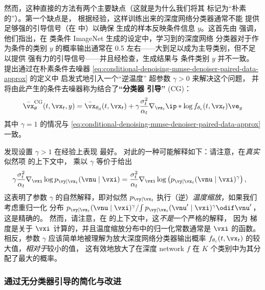 \documentclass[../../book-main_zh.tex]{subfiles}
\begin{document}
然而，这种直接的方法有两个主要缺点（这就是为什么我们将其
标记为“朴素的”）。第一个缺点是，
根据经验，这样训练出来的深度网络分类器通常不能
提供足够强的引导信号（在
 中）以确保
生成的样本反映条件信息 $y$。这首先由 \citet{Dhariwal2021-hg} 强调，他们指出，在
类条件 ImageNet 生成的设定中，学习到的深度网络
分类器对于作为条件的类别 $y$ 的概率输出通常在
0.5 左右——大到足以成为主导类别，但不足以提供
强有力的引导信号——并且经检查，生成结果与
条件类别 $y$ 并不一致。\citet{Dhariwal2021-hg} 提出通过在朴素条件去噪器
\eqref{eq:conditional-denoising-mmse-denoiser-paired-data-approx} 的定义中
启发式地引入一个“逆温度”
超参数 $\gamma > 0$ 来解决这个问题，
并将由此产生的条件去噪器称为结合了\textbf{“分类器
引导”}
(CG)：
\begin{equation}\label{eq:conditional-denoising-mmse-denoiser-paired-data-approx-cg}
    \bar{\vx}_{\theta}^{\mathrm{CG}}(t, \vx_t, y)
    =
    \bar{\vx}_{\theta_{\mathrm{d}}}(t, \vx_t)
    + \gamma\frac{\sigma_t^2}{\alpha_t}
    \nabla_{\vx_t}
    \ip*{
        \log f_{\theta_{\mathrm{c}}}(t, \vx_t)
    }{
        \ve_{y}
    }
\end{equation}
其中 $\gamma = 1$ 的情况与
\eqref{eq:conditional-denoising-mmse-denoiser-paired-data-approx} 一致。

\citet{Dhariwal2021-hg} 发现设置 $\gamma > 1$ 在经验上表现
最好。
对此的一种可能解释如下：请注意，在\textit{真实}似然项
 的上下文中，
乘以 $\gamma$ 等价于给出
\begin{align}
    \gamma\frac{\sigma_t^2}{\alpha_t} \nabla_{\vxi}\log p_{\vy \mid
    \vx_t}(\vnu\mid
    \vxi)
    &=
    \frac{\sigma_t^2}{\alpha_t} \nabla_{\vxi}\log \left(
        p_{\vy \mid \vx_t}(\vnu\mid \vxi)^\gamma
    \right), %
\end{align}
这表明了参数 $\gamma$ 的自然解释，即对似然
$p_{\vy \mid \vx_t}$ 执行（逆）\textit{温度缩放}，如果我们考虑重归一化
分布
$ { p_{\vy \mid \vx_t}(\vnu\mid \vxi)^\gamma } / { \int p_{\vy \mid
    \vx_t}(\vnu'\mid
\vxi)^\gamma \odif \vnu' } $，这是精确的。
然而，请注意，在  的上下文中，这\textit{不是}一个严格的解释，
因为
梯度是关于 $\vxi$ 计算的，并且温度缩放分布中的归一化常数通常是 $\vxi$ 的函数。
相反，参数 $\gamma$ 应该简单地被理解为放大深度网络分类器输出概率
$f_{\theta_{\mathrm{c}}}(t, \vx_t)$ 的较大值，\textit{相对于}较小的值，
这有效地放大了在深度
network $f$ 在 $K$ 个类别中为其分配了最大的概率。

\subsubsection{通过无分类器引导的简化与改进}
\end{document}
